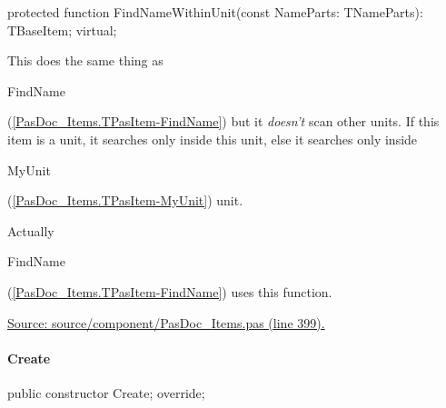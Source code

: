 \documentclass{report}
\newif\ifpdf
\begin{document}
\label{PasDoc_Items.TPasItem-FindNameWithinUnit}
\begin{list}{}{
\setlength{\itemindent}{0cm}
\setlength{\listparindent}{0cm}
\setlength{\leftmargin}{\evensidemargin}
\addtolength{\leftmargin}{\tmplength}
\settowidth{\labelsep}{X}
\addtolength{\leftmargin}{\labelsep}
\setlength{\labelwidth}{\tmplength}
}
\item[\textbf{Declaration}\hfill]
\ifpdf
\begin{flushleft}
\fi
\begin{ttfamily}
protected function FindNameWithinUnit(const NameParts: TNameParts): TBaseItem; virtual;\end{ttfamily}

\ifpdf
\end{flushleft}
\fi

\par
\item[\textbf{Description}]
This does the same thing as \begin{ttfamily}FindName\end{ttfamily}(\ref{PasDoc_Items.TPasItem-FindName}) but it \textit{doesn't} scan other units. If this item is a unit, it searches only inside this unit, else it searches only inside \begin{ttfamily}MyUnit\end{ttfamily}(\ref{PasDoc_Items.TPasItem-MyUnit}) unit.

Actually \begin{ttfamily}FindName\end{ttfamily}(\ref{PasDoc_Items.TPasItem-FindName}) uses this function.\par
\href{https://github.com/pasdoc/pasdoc/blob/master/source/component/PasDoc_Items.pas#L399}{Source: source/component/PasDoc{\_}Items.pas (line 399).}

\end{list}
\paragraph*{Create}\hspace*{\fill}

\label{PasDoc_Items.TPasItem-Create}
\begin{list}{}{
\setlength{\itemindent}{0cm}
\setlength{\listparindent}{0cm}
\setlength{\leftmargin}{\evensidemargin}
\addtolength{\leftmargin}{\tmplength}
\settowidth{\labelsep}{X}
\addtolength{\leftmargin}{\labelsep}
\setlength{\labelwidth}{\tmplength}
}
\item[\textbf{Declaration}\hfill]
\ifpdf
\begin{flushleft}
\fi
\begin{ttfamily}
public constructor Create; override;\end{ttfamily}

\ifpdf
\end{flushleft}
\fi

\end{list}
\end{document}
